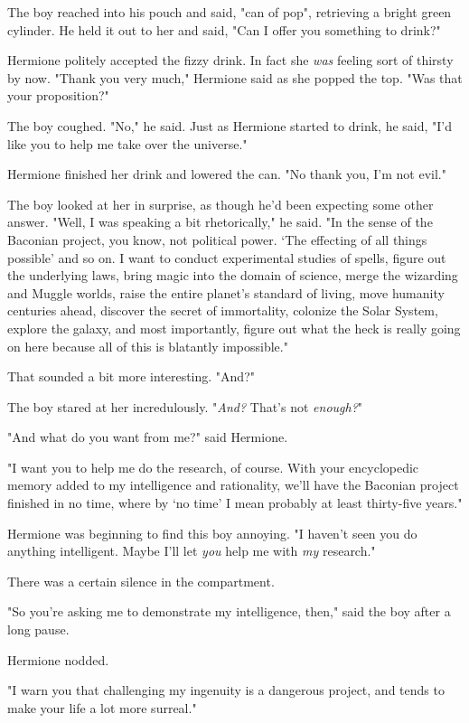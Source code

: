 The boy reached into his pouch and said, "can of pop", retrieving a bright 
green cylinder. He held it out to her and said, "Can I offer you something to 
drink?"

Hermione politely accepted the fizzy drink. In fact she \emph{was} feeling sort 
of thirsty by now. "Thank you very much," Hermione said as she popped the top. 
"Was that your proposition?"

The boy coughed. "No," he said. Just as Hermione started to drink, he said, 
"I'd like you to help me take over the universe."

Hermione finished her drink and lowered the can. "No thank you, I'm not evil."

The boy looked at her in surprise, as though he'd been expecting some other 
answer. "Well, I was speaking a bit rhetorically," he said. "In the sense of 
the Baconian project, you know, not political power. `The effecting of all 
things possible' and so on. I want to conduct experimental studies of spells, 
figure out the underlying laws, bring magic into the domain of science, merge 
the wizarding and Muggle worlds, raise the entire planet's standard of living, 
move humanity centuries ahead, discover the secret of immortality, colonize the 
Solar System, explore the galaxy, and most importantly, figure out what the 
heck is really going on here because all of this is blatantly impossible."

That sounded a bit more interesting. "And?"

The boy stared at her incredulously. "\emph{And?} That's not \emph{enough?}"

"And what do you want from me?" said Hermione.

"I want you to help me do the research, of course. With your encyclopedic 
memory added to my intelligence and rationality, we'll have the Baconian 
project finished in no time, where by `no time' I mean probably at least 
thirty-five years."

Hermione was beginning to find this boy annoying. "I haven't seen you do 
anything intelligent. Maybe I'll let \emph{you} help me with \emph{my} 
research."

There was a certain silence in the compartment.

"So you're asking me to demonstrate my intelligence, then," said the boy after 
a long pause.

Hermione nodded.

"I warn you that challenging my ingenuity is a dangerous project, and tends to 
make your life a lot more surreal."

